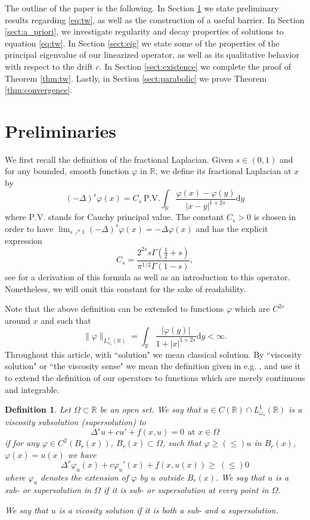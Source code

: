 \documentclass[11pt,a4paper]{amsart}
\newcommand{\R}{\mathbb{R}}
\newcommand{\PV}{\mathrm{P.V.}}
\newcommand{\Lomega}{L^1_{\omega_s}(\R)}
\newcommand{\dy}{\mathrm{d}y}
\renewcommand{\phi}{\varphi}
\newtheorem{defn}{Definition}
\begin{document}
The outline of the paper is the following. In Section \ref{sect:preliminaries} we state preliminary results regarding \eqref{eq:tw}, as well as the construction of a useful barrier. In Section \ref{sect:a_priori}, we investigate regularity and decay properties of solutions to equation \eqref{eq:tw}. In Section \ref{sect:eig} we state some of the properties of the principal eigenvalue of our linearized operator, as well as its qualitative behavior with respect to the drift $c$. In Section \ref{sect:existence} we complete the proof of Theorem \ref{thm:tw}. Lastly, in Section \ref{sect:parabolic} we prove Theorem \ref{thm:convergence}.

\section{Preliminaries}
\label{sect:preliminaries}

We first recall the definition of the fractional Laplacian. Given $s\in (0,1)$ and for any bounded, smooth function $\phi$ in $\R$, we define its fractional Laplacian at $x$ by
\[(-\Delta)^s \phi(x) = C_{s} ~ \PV \int_{\R} \frac{\phi(x)-\phi(y)}{|x-y|^{1+2s}} \dy \]
where $\PV$ stands for Cauchy principal value. The constant $C_{s} >0$ is chosen in order to have $\lim_{s\nearrow 1} (-\Delta)^s\phi(x) = -\Delta\phi(x)$ and has the explicit expression 
\[C_s = \frac{2^{2s}s\Gamma(\frac{1}{2} + s)}{\pi^{1/2} \Gamma(1-s)},\] 
see \cite{BV16} for a derivation of this formula as well as an introduction to this operator. Nonetheless, we will omit this constant for the sake of readability. 

Note that the above definition can be extended to functions $\phi$ which are $C^{2s}$ around $x$ and such that 
\[\|\phi\|_{\Lomega} = \int_{\R} \frac{|\phi(y)|}{1+|x|^{1+2s}} \dy < \infty.\]
Throughout this article, with ``solution" we mean classical solution. By ``viscosity solution" or ``the viscosity sense" we mean the definition given in e.g. \cite{CS09}, and use it to extend the definition of our operators to functions which are merely continuous and integrable.

\begin{defn}
Let $\Omega\subset \R$ be an open set. We say that $u\in C(\R) \cap \Lomega$ is a viscosity subsolution (supersolution) to 
\[\Delta^s u + cu' + f(x,u) = 0 ~~\text{at }x\in \Omega\]
if for any $\phi \in C^2(B_r(x))$, $B_r(x)\subset \Omega$, such that $\phi \geq (\leq) u$ in $B_r(x)$, $\phi(x) = u(x)$ we have
\[\Delta^s \phi_u(x) + c\phi_u'(x) + f(x, u(x)) \geq ~(\leq) 0\]
where $\phi_u$ denotes the extension of $\phi$ by $u$ outside $B_r(x)$. We say that $u$ is a sub- or supersolution in $\Omega$ if it is sub- or supersolution at every point in $\Omega$.

We say that $u$ is a vicosity solution if it is both a sub- and a supersolution.
\end{defn}
\end{document}

